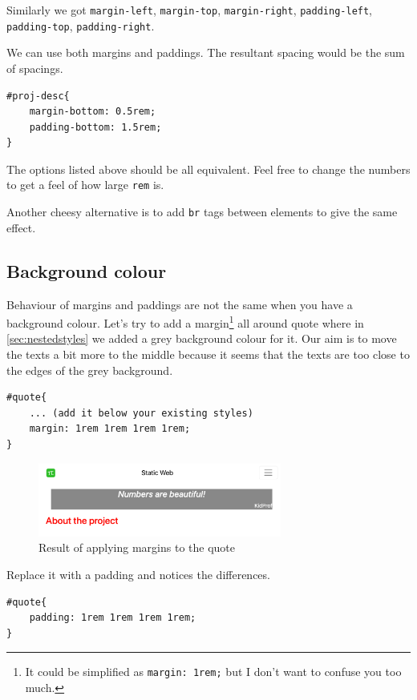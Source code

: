 Similarly we got \texttt{margin-left}, \texttt{margin-top}, \texttt{margin-right}, \texttt{padding-left}, \texttt{padding-top}, \texttt{padding-right}. 

We can use both margins and paddings. The resultant spacing would be the sum of spacings. 

\begin{lstlisting}[language=pug]
#proj-desc{
    margin-bottom: 0.5rem;
    padding-bottom: 1.5rem;
}
\end{lstlisting}

The options listed above should be all equivalent. Feel free to change the numbers to get a feel of how large \texttt{rem} is.
\vspace{6mm}

Another cheesy alternative is to add \texttt{br} tags between elements to give the same effect. 

\subsection*{Background colour}

Behaviour of margins and paddings are not the same when you have a background colour. Let's try to add a margin\footnote{It could be simplified as \texttt{margin: 1rem;} but I don't want to confuse you too much.} all around quote where in \cref{sec:nestedstyles} we added a grey background colour for it. Our aim is to move the texts a bit more to the middle because it seems that the texts are too close to the edges of the grey background.

\begin{lstlisting}[language=pug]
#quote{
    ... (add it below your existing styles)
    margin: 1rem 1rem 1rem 1rem;
}
\end{lstlisting}

\begin{figure}[H]
\centering
\includegraphics[width=8cm]{images/chn6-quote-margin.png}
\caption{Result of applying margins to the quote}
\end{figure}

Replace it with a padding and notices the differences.

\begin{lstlisting}[language=pug]
#quote{
    padding: 1rem 1rem 1rem 1rem;
}
\end{lstlisting}

